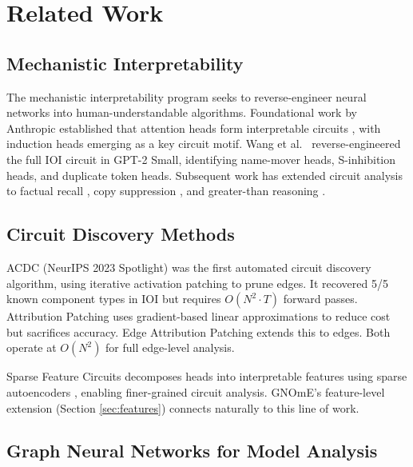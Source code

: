 \documentclass[11pt,a4paper]{article}
\begin{document}
\section{Related Work}

\subsection{Mechanistic Interpretability}

The mechanistic interpretability program \cite{olah2020zoom,elhage2021mathematical,elhage2022toy,elhage2022superposition} seeks to reverse-engineer neural networks into human-understandable algorithms. Foundational work by Anthropic established that attention heads form interpretable circuits \cite{elhage2021mathematical}, with induction heads \cite{olsson2022incontext} emerging as a key circuit motif. Wang et al.\ \cite{wang2023interpretability} reverse-engineered the full IOI circuit in GPT-2 Small, identifying name-mover heads, S-inhibition heads, and duplicate token heads. Subsequent work has extended circuit analysis to factual recall \cite{meng2022locating}, copy suppression \cite{mcdougall2023copy}, and greater-than reasoning \cite{hanna2023greater}.

\subsection{Circuit Discovery Methods}

ACDC \cite{conmy2023automated} (NeurIPS 2023 Spotlight) was the first automated circuit discovery algorithm, using iterative activation patching to prune edges. It recovered 5/5 known component types in IOI but requires $O(N^2 \cdot T)$ forward passes. Attribution Patching \cite{nanda2023attribution} uses gradient-based linear approximations to reduce cost but sacrifices accuracy. Edge Attribution Patching \cite{nanda2023edge} extends this to edges. Both operate at $O(N^2)$ for full edge-level analysis.

Sparse Feature Circuits \cite{marks2024sparse} decomposes heads into interpretable features using sparse autoencoders \cite{bricken2023towards,templeton2024scaling}, enabling finer-grained circuit analysis. GNOmE's feature-level extension (Section \ref{sec:features}) connects naturally to this line of work.

\subsection{Graph Neural Networks for Model Analysis}
\end{document}
